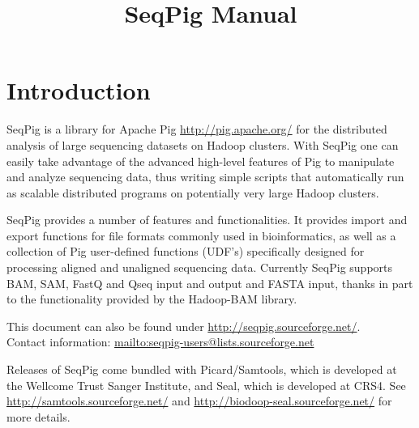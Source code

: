 \documentclass[a4paper,parskip=half,10pt,bibtotoc,abstracton,oneside,noindent,DIV15]{scrartcl}
\title{SeqPig Manual}
\begin{document}
\maketitle

\tableofcontents
\newpage

\section{Introduction}

SeqPig is a library for Apache Pig \url{http://pig.apache.org/} for the
distributed analysis of large sequencing datasets on Hadoop clusters.  With
SeqPig one can easily take advantage of the advanced high-level features of Pig
to manipulate and analyze sequencing data, thus writing simple scripts that
automatically run as scalable distributed programs on potentially very large
Hadoop clusters.

SeqPig provides a number of features and functionalities.  It provides
import and export functions for file formats commonly used in
bioinformatics, as well as a collection of Pig user-defined functions
(UDF's) specifically designed for processing aligned and unaligned
sequencing data. Currently SeqPig supports BAM, SAM, FastQ and Qseq
input and output and FASTA input, thanks in part to the functionality
provided by the Hadoop-BAM library.

This document can also be found under
\url{http://seqpig.sourceforge.net/}.\\ Contact information:
\url{mailto:seqpig-users@lists.sourceforge.net}

Releases of SeqPig come bundled with Picard/Samtools, which is
developed at the Wellcome Trust Sanger Institute, and Seal, which
is developed
at CRS4. See\\
\url{http://samtools.sourceforge.net/} and 
\url{http://biodoop-seal.sourceforge.net/}
for more details.




\end{document}

